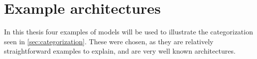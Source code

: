 \chapter{Example architectures}


In this thesis four examples of models will be used to illustrate the categorization seen in \autoref{sec:categorization}. These were chosen, as they are relatively straightforward examples to explain, and are very well known architectures.



